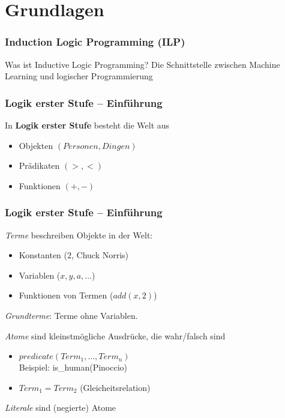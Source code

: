 \section{Grundlagen}

\begin{frame}
	\frametitle{Induction Logic Programming (ILP)}

	\begin{block}{Was ist Inductive Logic Programming?}
			Die Schnittstelle zwischen Machine Learning und logischer Programmierung
	\end{block}
\end{frame}

\begin{frame}
	\frametitle{Logik erster Stufe -- Einführung}

	In \textbf{Logik erster Stufe} besteht die Welt aus
	\begin{itemize}
		\item Objekten  $(Personen, Dingen)$
		\item Prädikaten $(>, <)$
		\item Funktionen $(+, -)$
	\end{itemize}
\end{frame}

\begin{frame}
	\frametitle{Logik erster Stufe -- Einführung}
	\emph{Terme} beschreiben Objekte in der Welt:\\
	\begin{itemize}
		\item Konstanten  ($2$, Chuck Norris)
		\item Variablen   ($x,y, a, \ldots$)
		\item Funktionen von Termen ($add(x,2)$)
	\end{itemize}

	\emph{Grundterme}: Terme ohne Variablen.
	\pause

	\vspace{15pt}
	\emph{Atome} sind kleinstmögliche Ausdrücke, die wahr/falsch sind
	\begin{itemize}
		\item $predicate(Term_1, \ldots, Term_n)$\\
			Beispiel: is\_human(Pinoccio)
		\item $Term_1 = Term_2$ (Gleicheitsrelation)
	\end{itemize}
	\emph{Literale} sind (negierte) Atome

\end{frame}

